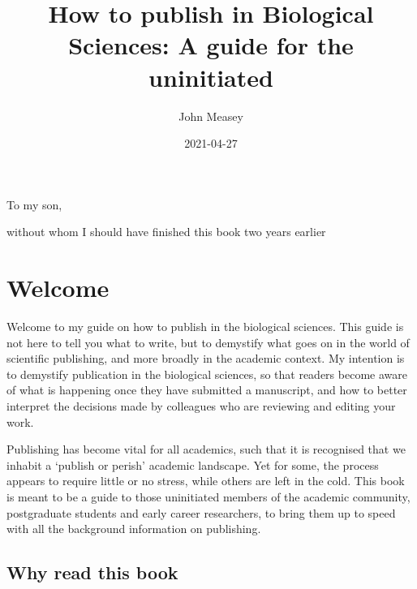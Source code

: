 \documentclass[
]{krantz}
\title{How to publish in Biological Sciences: A guide for the uninitiated}
\author{John Measey}
\date{2021-04-27}
\begin{document}
\maketitle


\thispagestyle{empty}

\begin{center}
To my son,

without whom I should have finished this book two years earlier
\end{center}

\setlength{\abovedisplayskip}{-5pt}
\setlength{\abovedisplayshortskip}{-5pt}

{
\hypersetup{linkcolor=}
\setcounter{tocdepth}{2}
\tableofcontents
}
\listoftables
\listoffigures
\hypertarget{welcome}{%
\chapter*{Welcome}\label{welcome}}


Welcome to my guide on how to publish in the biological sciences. This guide is not here to tell you what to write, but to demystify what goes on in the world of scientific publishing, and more broadly in the academic context. My intention is to demystify publication in the biological sciences, so that readers become aware of what is happening once they have submitted a manuscript, and how to better interpret the decisions made by colleagues who are reviewing and editing your work.

Publishing has become vital for all academics, such that it is recognised that we inhabit a `publish or perish' academic landscape. Yet for some, the process appears to require little or no stress, while others are left in the cold. This book is meant to be a guide to those uninitiated members of the academic community, postgraduate students and early career researchers, to bring them up to speed with all the background information on publishing.

\hypertarget{why-read-this-book}{%
\section*{Why read this book}\label{why-read-this-book}}
\end{document}
